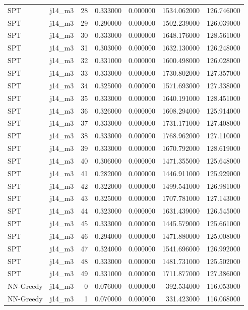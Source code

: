 \begin{tabular}{llrrrrr}
SPT & j14_m3 & 28 & 0.333000 & 0.000000 & 1534.062000 & 126.746000 \\
SPT & j14_m3 & 29 & 0.290000 & 0.000000 & 1502.239000 & 126.039000 \\
SPT & j14_m3 & 30 & 0.333000 & 0.000000 & 1648.176000 & 128.561000 \\
SPT & j14_m3 & 31 & 0.303000 & 0.000000 & 1632.130000 & 126.248000 \\
SPT & j14_m3 & 32 & 0.331000 & 0.000000 & 1600.498000 & 126.028000 \\
SPT & j14_m3 & 33 & 0.333000 & 0.000000 & 1730.802000 & 127.357000 \\
SPT & j14_m3 & 34 & 0.325000 & 0.000000 & 1571.693000 & 127.338000 \\
SPT & j14_m3 & 35 & 0.333000 & 0.000000 & 1640.191000 & 128.451000 \\
SPT & j14_m3 & 36 & 0.326000 & 0.000000 & 1608.294000 & 125.914000 \\
SPT & j14_m3 & 37 & 0.333000 & 0.000000 & 1731.171000 & 127.408000 \\
SPT & j14_m3 & 38 & 0.333000 & 0.000000 & 1768.962000 & 127.110000 \\
SPT & j14_m3 & 39 & 0.333000 & 0.000000 & 1670.792000 & 128.619000 \\
SPT & j14_m3 & 40 & 0.306000 & 0.000000 & 1471.355000 & 125.648000 \\
SPT & j14_m3 & 41 & 0.282000 & 0.000000 & 1446.911000 & 125.929000 \\
SPT & j14_m3 & 42 & 0.322000 & 0.000000 & 1499.541000 & 126.981000 \\
SPT & j14_m3 & 43 & 0.325000 & 0.000000 & 1707.781000 & 127.143000 \\
SPT & j14_m3 & 44 & 0.323000 & 0.000000 & 1631.439000 & 126.545000 \\
SPT & j14_m3 & 45 & 0.333000 & 0.000000 & 1445.579000 & 125.661000 \\
SPT & j14_m3 & 46 & 0.294000 & 0.000000 & 1471.880000 & 125.008000 \\
SPT & j14_m3 & 47 & 0.324000 & 0.000000 & 1541.696000 & 126.992000 \\
SPT & j14_m3 & 48 & 0.333000 & 0.000000 & 1481.731000 & 125.502000 \\
SPT & j14_m3 & 49 & 0.331000 & 0.000000 & 1711.877000 & 127.386000 \\
NN-Greedy & j14_m3 & 0 & 0.076000 & 0.000000 & 392.534000 & 116.053000 \\
NN-Greedy & j14_m3 & 1 & 0.070000 & 0.000000 & 331.423000 & 116.068000 \\

\end{tabular}
